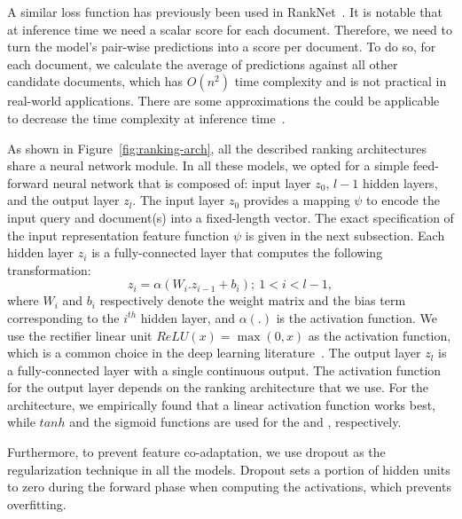A similar loss function has previously been used in RankNet~\citep{Burges:2005}. It is notable that at inference time we need a scalar score for each document. Therefore, we need to turn the model's pair-wise predictions into a score per document. To do so, for each document, we calculate the average of predictions against all other candidate documents, which has $O(n^2)$ time complexity and is not practical in real-world applications. There are some approximations the could be applicable to decrease the time complexity at inference time~\citep{Wauthier:2013}.

\medskip
As shown in Figure~\ref{fig:ranking-arch}, all the described ranking architectures share a neural network module. In all these models, we opted for a simple feed-forward neural network that is composed of: input layer $z_0$, $l-1$ hidden layers, and the output layer $z_l$. The input layer $z_0$ provides a mapping $\psi$ to encode the input query and document(s) into a fixed-length vector.
The exact specification of the input representation feature function $\psi$ is given in the next subsection. 
Each hidden layer $z_i$ is a fully-connected layer that computes the following transformation:
\begin{equation}
    z_i = \alpha(W_i.z_{i-1} + b_i); ~ 1<i<l-1,
\end{equation}
where $W_i$ and $b_i$ respectively denote the weight matrix and the bias term corresponding to the $i^{th}$ hidden layer, and $\alpha(.)$ is the activation function. We use the rectifier linear unit $\textit{ReLU}(x) = \max(0, x)$ as the activation function, which is a common choice in the deep learning literature~\citep{Lecun:2015}. 
The output layer $z_l$ is a fully-connected layer with a single continuous output. The activation function for the output layer depends on the ranking architecture that we use. For the \modelone architecture, we empirically found that a linear activation function works best, while $tanh$ and the sigmoid functions are used for the \modeltwo and \modelthree, respectively.

Furthermore, to prevent feature co-adaptation, we use dropout as the regularization technique in all the models. Dropout sets a portion of hidden units to zero during the forward phase when computing the activations, which prevents overfitting.


